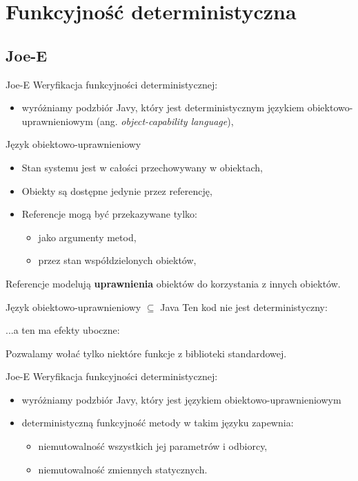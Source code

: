\documentclass[handout]{beamer}
\begin{document}
\section{Funkcyjność deterministyczna}

\subsection{Joe-E}

\begin{frame}{Joe-E}
  Weryfikacja funkcyjności deterministycznej:
  \begin{itemize}
    \item wyróżniamy podzbiór Javy, który jest deterministycznym językiem
      obiektowo-uprawnieniowym (ang. \emph{object-capability language}), 
  \end{itemize}
\end{frame}

\begin{frame}{Język obiektowo-uprawnieniowy}
  \begin{itemize}
  \item<1-> Stan systemu jest w całości przechowywany w obiektach, 
  \item<2-> Obiekty są dostępne jedynie przez referencję, 
  \item<3-> Referencje mogą być przekazywane tylko:
    \begin{itemize}
      \item jako argumenty metod, 
      \item przez stan współdzielonych obiektów, 
    \end{itemize}
  \end{itemize}
  \pause
  Referencje modelują {\bf uprawnienia} obiektów do korzystania z
  innych obiektów.
\end{frame}

\begin{frame}{Język obiektowo-uprawnieniowy $\subseteq$ Java}
  Ten kod nie jest deterministyczny:
  
  \pause
  ...a ten ma efekty uboczne:
  
  \pause
  Pozwalamy wołać tylko niektóre funkcje z biblioteki standardowej.
\end{frame}

\begin{frame}{Joe-E}
  Weryfikacja funkcyjności deterministycznej:
  \begin{itemize}
    \item wyróżniamy podzbiór Javy, który jest językiem
      obiektowo-uprawnieniowym
    \item deterministyczną funkcyjność metody w takim języku 
      zapewnia:
      \begin{itemize}
      \item niemutowalność wszystkich jej parametrów i odbiorcy, 
      \item niemutowalność zmiennych statycznych.
      \end{itemize}
  \end{itemize}
\end{frame}
\end{document}
